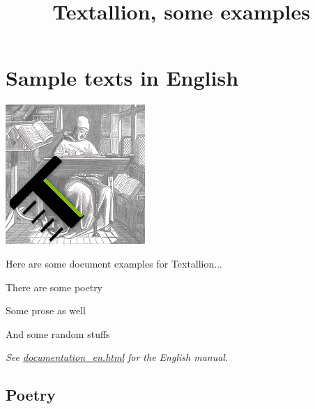 \documentclass[openany]{book} %
\title{Textallion, some examples}
\begin{document}
 \renewcommand*{\labelitemi}{$\bullet$} \renewcommand*{\labelitemii}{$\circ$} \renewcommand*{\labelitemiii}{$\cdot$} \renewcommand*{\labelitemiv}{$\diamond$}

\raggedbottom %

\maketitle
\thispagestyle{empty}

\clearpage


\tableofcontents
\clearpage

\hypertarget{toc1}{}
\pagebreak[\PAGExBREAKxPOLICY]
\part{Sample texts in English}

\includegraphics{../media/logo_textallion.png}

Here are some document examples for Textallion...

\begin{compactenum}
\item There are some poetry
\item Some prose as well
\item And some random stuffs
\end{compactenum}

\textit{See \href{../docs/documentation\_en.html}{documentation\_en.html} for the English manual.}

\hypertarget{toc2}{}
\pagebreak[\PAGExBREAKxPOLICY]
\chapter{Poetry}
\end{document}
